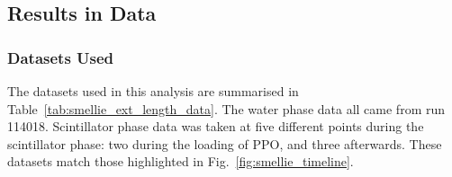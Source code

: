 





\subsection{Results in Data}
\subsubsection{Datasets Used}
The datasets used in this analysis are summarised in Table~\ref{tab:smellie_ext_length_data}. The water phase data all came from run \num{114018}. Scintillator phase data was taken at five different points during the scintillator phase: two during the loading of PPO, and three afterwards. These datasets match those highlighted in Fig.~\ref{fig:smellie_timeline}.

